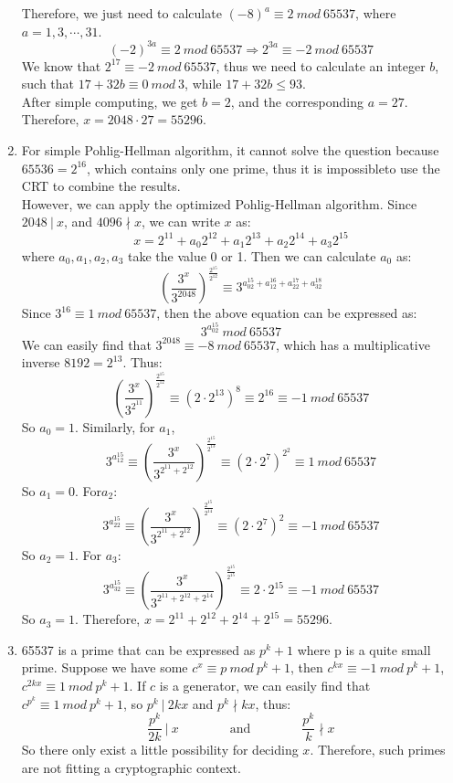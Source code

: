\documentclass[12pt, a4paper]{article}
\begin{document}
\begin{enumerate}
\begin{center}
\begin{tabular}{c|c|c}
              \end{tabular}
          \end{center}
          Therefore, we just need to calculate $(-8)^a \equiv 2\ mod\ 65537$, where $a = 1, 3,\cdots, 31$. 
          $$(-2)^{3a} \equiv 2\ mod\ 65537 \Rightarrow 2^{3a} \equiv -2\ mod\ 65537$$
          We know that $2^{17} \equiv -2\ mod\ 65537$, thus we need to calculate an integer $b$, 
          such that $17 + 32b \equiv 0\ mod\ 3$, while $17 + 32b \leq 93$.\\
          After simple computing, we get $b = 2$, and the corresponding $a = 27$. Therefore, 
          $x = 2048 \cdot 27 = 55296$.
    \item For simple Pohlig-Hellman algorithm, it cannot solve the question because $65536 = 2^{16}$, 
          which contains only one prime, thus it is impossibleto use the CRT to combine the results.\\
          However, we can apply the optimized Pohlig-Hellman algorithm. Since $2048\ |\ x$, 
          and $4096 \nmid x$, we can write $x$ as:
          $$x = 2^{11} + a_0{2^12} + a_1{2^13} + a_2{2^14} + a_3{2^15}$$
          where $a_0, a_1, a_2, a_3$ take the value 0 or 1.
          Then we can calculate $a_0$ as:
          $$(\frac{3^x}{3^{2048}})^{\frac{2^{15}}{2^{12}}} \equiv 3^{a_02^{15} + a_12^{16}+a_22^{17}+a_32^{18}}$$
          Since $3^{16} \equiv 1\ mod\ 65537$, then the above equation can be expressed as:
          $$3^{a_02^{15}}\ mod\ 65537$$
          We can easily find that $3^{2048} \equiv -8\ mod\ 65537$, 
          which has a multiplicative inverse $8192 = 2^{13}$. Thus:
          $$(\frac{3^x}{3^{2^{11}}})^{\frac{2^{15}}{2^{12}}} \equiv (2\cdot 2^{13})^8 \equiv 2^{16} \equiv -1\ mod\ 65537$$
          So $a_0 = 1$. 
          Similarly, for $a_1$, 
          $$3^{a_12^{15}} \equiv (\frac{3^x}{3^{2^{11}+2^{12}}})^{\frac{2^{15}}{2^{13}}} \equiv (2\cdot 2^{7})^{2^{2}} 
          \equiv 1\ mod\ 65537$$
          So $a_1 = 0$. For$a_2$:
          $$3^{a_22^{15}} \equiv (\frac{3^x}{3^{2^{11}+2^{12}}})^{\frac{2^{15}}{2^{14}}} \equiv (2\cdot 2^7)^2 
          \equiv -1\ mod\ 65537$$
          So $a_2 = 1$. For $a_3$:
          $$3^{a_32^{15}} \equiv (\frac{3^x}{3^{2^{11}+2^{12}+2^{14}}})^{\frac{2^{15}}{2^{15}}} \equiv 2\cdot 2^15 
          \equiv -1\ mod\ 65537$$
          So $a_3 = 1$. Therefore, $x = 2^{11} + 2^{12} + 2^{14} + 2^{15} = 55296$.
    \item 65537 is a prime that can be expressed as $p^k + 1$ where p is a quite small prime. 
          Suppose we have some $c^x \equiv p\ mod\ p^k+1$, then $c^{kx} \equiv -1\ mod\ p^k + 1$, 
          $c^{2kx} \equiv 1\ mod\ p^k + 1$. If $c$ is a generator, we can easily find that $c^{p^k} \equiv 1\ mod\ p^k + 1$, 
          so $p^k\ |\ 2kx$ and $p^k \nmid kx$, thus:
          $$\frac{p^k}{2k}\ |\ x \qquad \qquad \text{and} \qquad \qquad \frac{p^k}{k} \nmid x$$
          So there only exist a little possibility for deciding $x$. 
          Therefore, such primes are not fitting a cryptographic context.


\end{enumerate}
\end{document}
